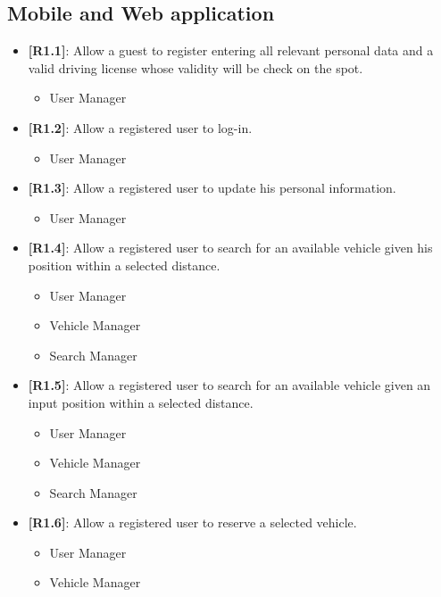 \subsection{Mobile and Web application}
\begin{itemize}
	\item{\textbf{[R1.1]}}: Allow a guest to register entering all relevant personal data and a valid driving license whose validity will be check on the spot.
	\begin{itemize}
	\item User Manager\\
	\end{itemize}
	\item{\textbf{[R1.2]}}: Allow a registered user to log-in.
	\begin{itemize}
	\item User Manager\\
	\end{itemize}
	\item{\textbf{[R1.3]}}: Allow a registered user to update his personal information.
	\begin{itemize}
	\item User Manager\\
	\end{itemize}
	\item{\textbf{[R1.4]}}: Allow a registered user to search for an available vehicle given his position within a selected distance.
	\begin{itemize}
	\item User Manager
	\item Vehicle Manager
	\item Search Manager\\
	\end{itemize}
	\item{\textbf{[R1.5]}}: Allow a registered user to search for an available vehicle given an input position within a selected distance.
	\begin{itemize}
	\item User Manager
	\item Vehicle Manager
	\item Search Manager\\
	\end{itemize}
	\item{\textbf{[R1.6]}}: Allow a registered user to reserve a selected vehicle.
	\begin{itemize}
	\item User Manager
	\item Vehicle Manager

\end{itemize}
\end{itemize}
